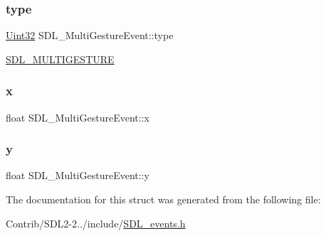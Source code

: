 \subsubsection{\texorpdfstring{type}{type}}
{\footnotesize\ttfamily \mbox{\hyperlink{_s_d_l__stdinc_8h_add440eff171ea5f55cb00c4a9ab8672d}{Uint32}} S\+D\+L\+\_\+\+Multi\+Gesture\+Event\+::type}

\mbox{\hyperlink{_s_d_l__events_8h_a3b589e89be6b35c02e0dd34a55f3fccaaa225e29d8bf6e619dda824c81826c929}{S\+D\+L\+\_\+\+M\+U\+L\+T\+I\+G\+E\+S\+T\+U\+RE}} \mbox{\label{struct_s_d_l___multi_gesture_event_a1708fc3c788fd12cc0beb5dc05cf31ca}} 
\subsubsection{\texorpdfstring{x}{x}}
{\footnotesize\ttfamily float S\+D\+L\+\_\+\+Multi\+Gesture\+Event\+::x}

\mbox{\label{struct_s_d_l___multi_gesture_event_a264602b9c5cc027eb6a283adda428454}} 
\subsubsection{\texorpdfstring{y}{y}}
{\footnotesize\ttfamily float S\+D\+L\+\_\+\+Multi\+Gesture\+Event\+::y}



The documentation for this struct was generated from the following file\+:\begin{DoxyCompactItemize}
\item 
Contrib/\+S\+D\+L2-\/2../include/\mbox{\hyperlink{_s_d_l__events_8h}{S\+D\+L\+\_\+events.\+h}}\end{DoxyCompactItemize}
